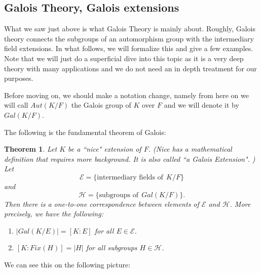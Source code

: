 \documentclass[12pt]{article}
\theoremstyle{plain}
\newtheorem{theorem}{Theorem}
\theoremstyle{definition}
\theoremstyle{remark}
\begin{document}
\subsection{Galois Theory, Galois extensions}
What we saw just above is what Galois Theory is mainly about. Roughly, Galois theory connects the subgroups of an automorphism group with the intermediary field extensions. 
In what follows, we will formalize this and give a few examples. Note that we will just do a superficial dive into this topic as it is a very deep theory with many applications and we do not need an in depth treatment for our purposes. 

Before moving on, we should make a notation change, namely from here on we will call $Aut(K/F)$ the Galois group of $K$ over $F$ and we will denote it by $Gal(K/F)$.

The following is the fundamental theorem of Galois:
\begin{theorem}
Let $K$ be a ``nice" extension of $F$. (Nice has a mathematical definition that requires more background. It is also called ``a Galois Extension". ) Let
$$\mathcal{E} = \{\textrm{intermediary fields of} \:\: K/F\}$$
and
$$\mathcal{H} = \{\textrm{subgroups of} \:\: Gal(K/F)\}.$$
Then there is a one-to-one correspondence between elements of $\mathcal{E}$ and $\mathcal{H}$. More precisely, we have the following:
\begin{enumerate}
    \item $|Gal(K/E)| = [K:E]$ for all $E\in \mathcal{E}$.
    \item $[K:Fix(H)]=|H|$ for all subgroups $H\in \mathcal{H}$.  
\end{enumerate}
\end{theorem}

We can see this on the following picture:

    
\end{document}
